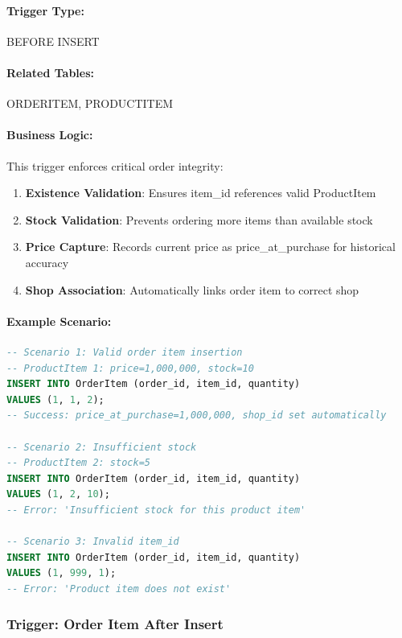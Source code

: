 \paragraph{Trigger Type:} BEFORE INSERT

\paragraph{Related Tables:} ORDERITEM, PRODUCTITEM

\paragraph{Business Logic:}
This trigger enforces critical order integrity:
\begin{enumerate}
    \item \textbf{Existence Validation}: Ensures item\_id references valid ProductItem
    \item \textbf{Stock Validation}: Prevents ordering more items than available stock
    \item \textbf{Price Capture}: Records current price as price\_at\_purchase for historical accuracy
    \item \textbf{Shop Association}: Automatically links order item to correct shop
\end{enumerate}

\paragraph{Example Scenario:}

\begin{lstlisting}[language=SQL]
-- Scenario 1: Valid order item insertion
-- ProductItem 1: price=1,000,000, stock=10
INSERT INTO OrderItem (order_id, item_id, quantity)
VALUES (1, 1, 2);
-- Success: price_at_purchase=1,000,000, shop_id set automatically

-- Scenario 2: Insufficient stock
-- ProductItem 2: stock=5
INSERT INTO OrderItem (order_id, item_id, quantity)
VALUES (1, 2, 10);
-- Error: 'Insufficient stock for this product item'

-- Scenario 3: Invalid item_id
INSERT INTO OrderItem (order_id, item_id, quantity)
VALUES (1, 999, 1);
-- Error: 'Product item does not exist'
\end{lstlisting}

\subsubsection{Trigger: Order Item After Insert}

